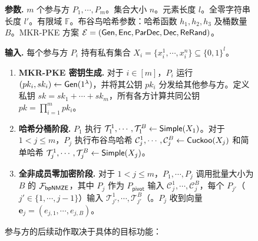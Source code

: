 \begin{figure}[!htb]
\begin{framed}
\begin{minipage}[c]{\textwidth}
\begin{trivlist}
\item \textbf{参数.} $m$ 个参与方 $P_1, \cdots, P_m$。集合大小 $n$。元素长度 $l$。全零字符串长度 $l'$。有限域 $\mathbb{F}$。布谷鸟哈希参数：哈希函数 $h_1, h_2, h_3$ 及桶数量 $B$。MKR-PKE 方案 $\mathcal{E} = (\mathsf{Gen}, \mathsf{Enc}, \mathsf{ParDec}, \mathsf{Dec}, \mathsf{ReRand})$。
\item \textbf{输入.} 每个参与方 $P_i$ 持有私有集合 $X_i = \{x_i^1,\cdots, x_i^n\} \subseteq \{0,1\}^l$。
\begin{enumerate}[itemsep=2pt,topsep=0pt,parsep=0pt]
\item \textbf{MKR-PKE 密钥生成.} 对于 $i \in [m]$，$P_i$ 运行 $(pk_i, sk_i) \gets \mathsf{Gen}(1^\lambda)$，并将其公钥 $pk_i$ 分发给其他参与方。定义私钥 $sk = sk_1 + \cdots + sk_m$，所有各方计算共同公钥 $pk= \prod_{i =1}^m pk_i$。
\item \textbf{哈希分桶阶段.} $P_1$ 执行 $\mathcal{T}_1^1, \cdots, \mathcal{T}_1^B \gets \mathsf{Simple}(X_1)$。对于 $1 < j \le m $，$P_j$ 执行布谷鸟哈希 $\mathcal{C}_j^1, \cdots, \mathcal{C}_j^B \gets \mathsf{Cuckoo}(X_j)$ 和简单哈希 $\mathcal{T}_j^1, \cdots, \mathcal{T}_j^B \gets \mathsf{Simple}(X_j)$。
\item \textbf{全非成员零加密阶段.} 对于 $1 < j \le m$，$P_1, \cdots, P_j$ 调用批量大小为 $B$ 的 $\mathcal{F}_\mathsf{bpNMZE}$，其中 $P_j$ 作为 $P_\mathsf{pivot}$ 输入 $\mathcal{C}_j^1, \cdots, \mathcal{C}_j^B$，每个 $P_{j'}$（$j' \in \{1,\cdots,j-1\}$）输入 $\mathcal{T}_{j'}^1, \cdots, \mathcal{T}_{j'}^B$（。$P_{j}$ 收到向量 $\textbf{e}_{j}=(e_{j,1},\cdots,e_{j,B})$。
\end{enumerate}

参与方的后续动作取决于具体的目标功能：


\end{trivlist}
\end{minipage}
\end{framed}
\end{figure}
